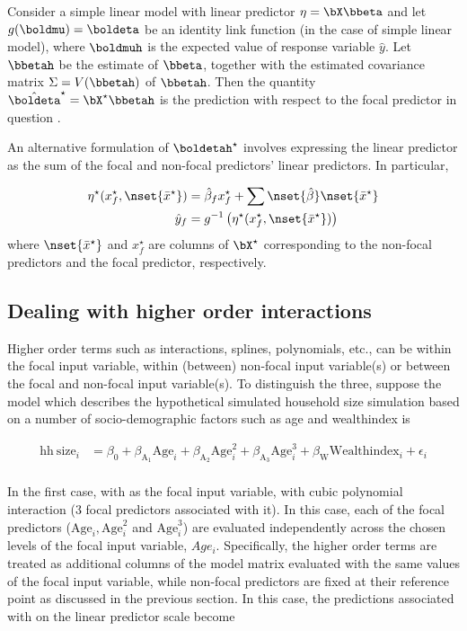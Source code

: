 Consider a simple linear model with linear predictor $\eta = \bX\bbeta$ and let $g(\boldmu) = \boldeta$ be an identity link function (in the case of simple linear model), where $\boldmuh$ is the expected value of response variable $\hat{y}$. Let $\bbetah$ be the estimate of $\bbeta$, together with the estimated covariance matrix $\Sigma = V(\bbetah)$ of $\bbetah$. Then the quantity $\hat{\boldeta}^\star = \bX^\star\bbetah$ is the prediction with respect to the focal predictor in question \citep{fox2009effect}.

An alternative formulation of $\boldetah^\star$ involves expressing the linear predictor as the sum of the focal and non-focal predictors' linear predictors. In particular, 

\begin{align}\label{eq:eta_mean}
\eta^\star(x^\star_f, \nset{{\bar{x}^\star}}) &= \hat{\beta}_f x^\star_f + \sum \nset{\hat{\beta}} \nset{{\bar{x}^\star}} \\
\hat{y}_f  &= g^{-1} \left(\eta^\star(x^\star_f, \nset{{\bar{x}^\star}})\right)
\end{align}
where $\nset{{\bar{x}^\star}}$ and $x^\star_f$ are columns of $\bX^\star$ corresponding to the non-focal predictors and the focal predictor, respectively.


\subsection{Dealing with higher order interactions}

Higher order terms such as interactions, splines, polynomials, etc., can be within the focal input variable, within (between) non-focal input variable(s) or between the focal and non-focal input variable(s). To distinguish the three, suppose the model which describes the hypothetical simulated household size simulation based on a number of socio-demographic factors such as age and wealthindex is

\begin{align}\label{eq:lm_cubic}
\mathrm{hh~size}_i &= \beta_0 + \beta_{\mathrm{A_1}}\mathrm{Age}_i + \beta_{\mathrm{A_2}}\mathrm{Age}^2_i + \beta_{\mathrm{A_3}}\mathrm{Age}^3_i + \beta_{\mathrm{W}}\mathrm{Wealthindex}_i + \epsilon_i \nonumber\\
\end{align}

In the first case, with  as the focal input variable, with cubic polynomial interaction ($3$ focal predictors associated with it). In this case, each of the focal predictors ($\mathrm{Age}_i, \mathrm{Age}^2_i$ and $\mathrm{Age}^3_i$) are evaluated independently across the chosen levels of the focal input variable, $Age_i$. Specifically, the higher order terms are treated as additional columns of the model matrix evaluated with the same values of the focal input variable, while non-focal predictors are fixed at their reference point as discussed in the previous section. In this case, the predictions associated with  on the linear predictor scale become

